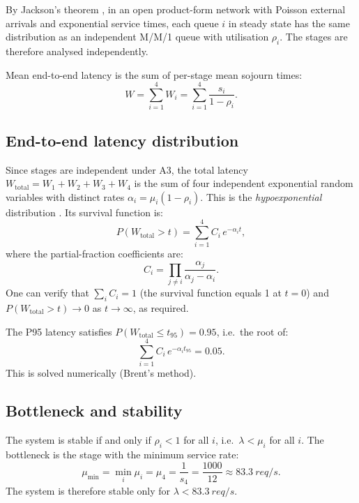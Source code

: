 \documentclass[12pt,a4paper]{article}
\begin{document}
By Jackson's theorem \cite{jackson1957}, in an open product-form network with Poisson
external arrivals and exponential service times, each queue $i$ in steady state has the
same distribution as an independent M/M/1 queue with utilisation $\rho_i$. The stages
are therefore analysed independently.

Mean end-to-end latency is the sum of per-stage mean sojourn times:
\begin{equation}
  W = \sum_{i=1}^{4} W_i = \sum_{i=1}^{4} \frac{s_i}{1 - \rho_i}.
  \label{eq:e2e_mean}
\end{equation}

\subsection{End-to-end latency distribution}

Since stages are independent under A3, the total latency
$W_{\mathrm{total}} = W_1 + W_2 + W_3 + W_4$ is the sum of four independent exponential
random variables with distinct rates $\alpha_i = \mu_i(1-\rho_i)$. This is the
\textit{hypoexponential} distribution \cite{latouche1999}. Its survival function is:
\begin{equation}
  P(W_{\mathrm{total}} > t) = \sum_{i=1}^{4} C_i\,e^{-\alpha_i t},
  \label{eq:hypo_survival}
\end{equation}
where the partial-fraction coefficients are:
\begin{equation}
  C_i = \prod_{j \neq i} \frac{\alpha_j}{\alpha_j - \alpha_i}.
  \label{eq:hypo_coeff}
\end{equation}
One can verify that $\sum_i C_i = 1$ (the survival function equals 1 at $t=0$) and
$P(W_{\mathrm{total}} > t) \to 0$ as $t \to \infty$, as required.

The P95 latency satisfies $P(W_{\mathrm{total}} \leq t_{95}) = 0.95$, i.e.\ the root of:
\begin{equation}
  \sum_{i=1}^{4} C_i\,e^{-\alpha_i t_{95}} = 0.05.
  \label{eq:p95}
\end{equation}
This is solved numerically (Brent's method).

\subsection{Bottleneck and stability}

The system is stable if and only if $\rho_i < 1$ for all $i$, i.e.\ $\lambda < \mu_i$ for all $i$.
The bottleneck is the stage with the minimum service rate:
\begin{equation}
  \mu_{\min} = \min_i \mu_i = \mu_4 = \frac{1}{s_4} = \frac{1000}{12} \approx \SI{83.3}{req/s}.
  \label{eq:bottleneck}
\end{equation}
The system is therefore stable only for $\lambda < \SI{83.3}{req/s}$.
\end{document}
